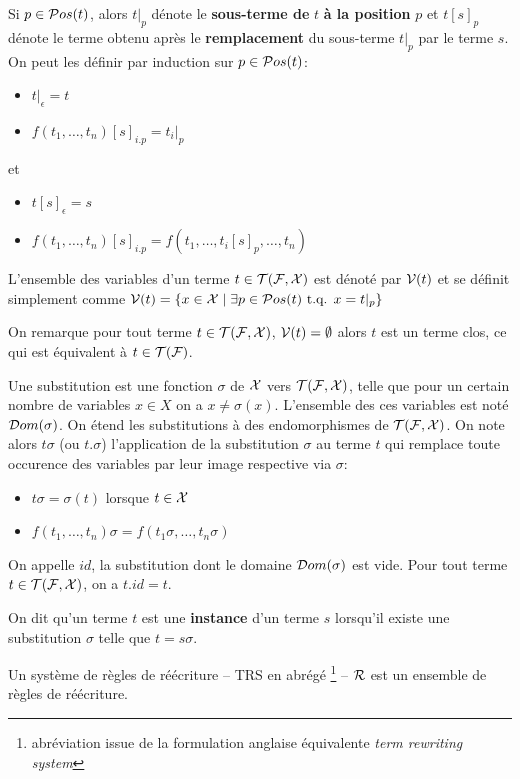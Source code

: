 Si $p \in \mathcal{ P}os(t)$, alors $t|_p$ dénote le \textbf{sous-terme de} $t$ \textbf{à la position} $p$ et
$t[s]_p$ dénote le terme obtenu après le \textbf{remplacement} du sous-terme $t|_p$ par le terme $s$.
On peut les définir par induction sur $p \in \mathcal{ P}os(t)$:
\begin{itemize}
\item $t|_\epsilon = t$
\item $f(t_1,\dots, t_n)[s]_{i.p} = t_i|_p$
\end{itemize}
et
\begin{itemize}
\item $t[s]_\epsilon = s$
\item $f(t_1,\dots, t_n)[s]_{i.p} = f(t_1,\dots, t_i[s]_p,\dots,t_n)$
\end{itemize}

\begin{definition}
  L'ensemble des variables d'un terme $t \in \mathcal{T(F, X)}$ est dénoté par $\mathcal V(t)$ et se définit simplement
  comme $\mathcal V(t) = \{ x \in \mathcal X \; | \; \exists p \in \mathcal{ P}os(t) \mbox{ t.q. } x = t|_p\}$
\end{definition}
On remarque pour tout terme $t \in \mathcal{T(F, X)}$, $\mathcal V(t) = \emptyset$ alors $t$ est un terme clos, ce qui est équivalent à $t \in \mathcal{T(F)}$.

\begin{definition}
  Une substitution est une fonction $\sigma$ de $\mathcal X$ vers $\mathcal{T(F, X)}$, telle que 
  pour un certain nombre de variables $x \in X$ on a $x \not= \sigma(x)$.
  L'ensemble des ces variables est noté $\mathcal{D}om(\sigma)$.
  On étend les substitutions à des endomorphismes de $\mathcal{T(F, X)}$. 
  On note alors $t\sigma$ (ou $t.\sigma$) l'application de la substitution $\sigma$ au terme $t$ 
  qui remplace toute occurence des variables par leur image respective via $\sigma$:
  \begin{itemize}
  \item $t\sigma = \sigma(t)$ lorsque $t \in \mathcal X$
  \item $f(t_1, \dots, t_n)\sigma = f(t_1\sigma, \dots, t_n\sigma)$
  \end{itemize}
\end{definition}
On appelle $id$, la substitution dont le domaine $\mathcal{D}om(\sigma)$ est vide.
Pour tout terme $t \in \mathcal{T(F, X)}$, on a $t.id = t$.

On dit qu'un terme $t$ est une \textbf{instance} d'un terme $s$ lorsqu'il existe une substitution
$\sigma$ telle que $t = s\sigma$.

Un système de règles de réécriture -- TRS en abrégé
\footnote{\footnotesize abréviation issue de la formulation anglaise équivalente {\em term rewriting system}} -- 
$\mathcal R$ est un ensemble de règles de réécriture. 

